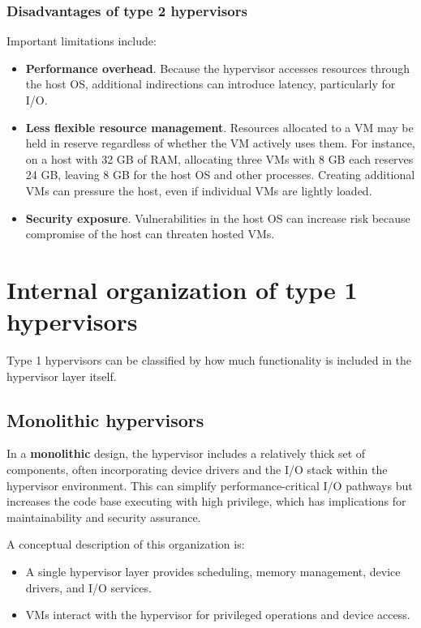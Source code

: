 \documentclass[11pt,a4paper,openany]{report}
\begin{document}
\subsubsection*{Disadvantages of type 2 hypervisors}

Important limitations include:

\begin{itemize}
\item \textbf{Performance overhead}. Because the hypervisor accesses resources through the host OS, additional indirections can introduce latency, particularly for I/O.
\item \textbf{Less flexible resource management}. Resources allocated to a VM may be held in reserve regardless of whether the VM actively uses them. For instance, on a host with 32 GB of RAM, allocating three VMs with 8 GB each reserves 24 GB, leaving 8 GB for the host OS and other processes. Creating additional VMs can pressure the host, even if individual VMs are lightly loaded.
\item \textbf{Security exposure}. Vulnerabilities in the host OS can increase risk because compromise of the host can threaten hosted VMs.
\end{itemize}

\section{Internal organization of type 1 hypervisors}

Type 1 hypervisors can be classified by how much functionality is included in the hypervisor layer itself.

\subsection{Monolithic hypervisors}

In a \textbf{monolithic} design, the hypervisor includes a relatively thick set of components, often incorporating device drivers and the I/O stack within the hypervisor environment. This can simplify performance-critical I/O pathways but increases the code base executing with high privilege, which has implications for maintainability and security assurance.

A conceptual description of this organization is:

\begin{itemize}
\item A single hypervisor layer provides scheduling, memory management, device drivers, and I/O services.
\item VMs interact with the hypervisor for privileged operations and device access.
\end{itemize}
\end{document}
